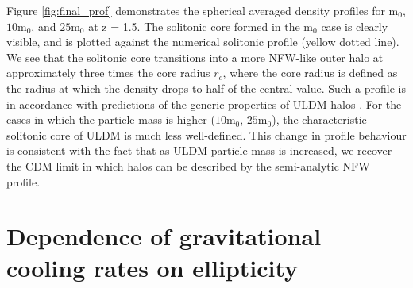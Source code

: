 \documentclass[a4paper,11pt]{article}
\begin{document}
Figure \ref{fig:final_prof} demonstrates the spherical averaged density profiles for $\mathrm{m}_0$, $\mathrm{10m}_0$, and $\mathrm{25m}_0$ at z = 1.5. The solitonic core formed in the $\mathrm{m}_0$ case is clearly visible, and is plotted against the numerical solitonic profile (yellow dotted line). We see that the solitonic core transitions into a more NFW-like outer halo at approximately three times the core radius $r_c$, where the core radius is defined as the radius at which the density drops to half of the central value. Such a profile is in accordance with predictions of the generic properties of ULDM halos \cite{Veltmaat:2018dfz, Lin:2018whl, Chavanis:2018pkx}. For the cases in which the particle mass is higher ($\mathrm{10m}_0$, $\mathrm{25m}_0$), the characteristic solitonic core of ULDM is much less well-defined. This change in profile behaviour is consistent with the fact that as ULDM particle mass is increased, we recover the CDM limit in which halos can be described by the semi-analytic NFW profile. 

\section{Dependence of gravitational cooling rates on ellipticity}\label{sec:flattening}
\end{document}
